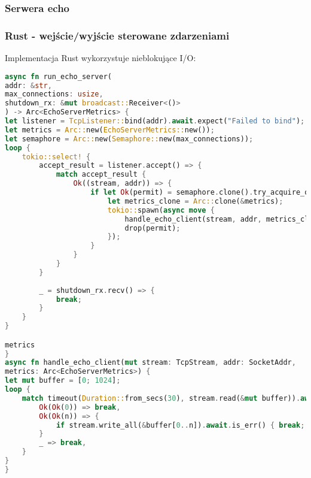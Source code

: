 \subsubsection{Serwera echo}

\subsubsection{Rust - wejście/wyjście sterowane zdarzeniami}
Implementacja Rust wykorzystuje nieblokujące I/O:
\begin{lstlisting}[language=Rust, caption={Echo Serwer w Rust z tokio::select!}, label={lst:rust_echo_server}]
async fn run_echo_server(
addr: &str,
max_connections: usize,
shutdown_rx: &mut broadcast::Receiver<()>
) -> Arc<EchoServerMetrics> {
let listener = TcpListener::bind(addr).await.expect("Failed to bind");
let metrics = Arc::new(EchoServerMetrics::new());
let semaphore = Arc::new(Semaphore::new(max_connections));
loop {
    tokio::select! {
        accept_result = listener.accept() => {
            match accept_result {
                Ok((stream, addr)) => {
                    if let Ok(permit) = semaphore.clone().try_acquire_owned() {
                        let metrics_clone = Arc::clone(&metrics);
                        tokio::spawn(async move {
                            handle_echo_client(stream, addr, metrics_clone).await;
                            drop(permit);
                        });
                    }
                }
            }
        }
        
        _ = shutdown_rx.recv() => {
            break;
        }
    }
}

metrics
}
async fn handle_echo_client(mut stream: TcpStream, addr: SocketAddr,
metrics: Arc<EchoServerMetrics>) {
let mut buffer = [0; 1024];
loop {
    match timeout(Duration::from_secs(30), stream.read(&mut buffer)).await {
        Ok(Ok(0)) => break,
        Ok(Ok(n)) => {
            if stream.write_all(&buffer[0..n]).await.is_err() { break; }
        }
        _ => break,
    }
}
}
\end{lstlisting}

